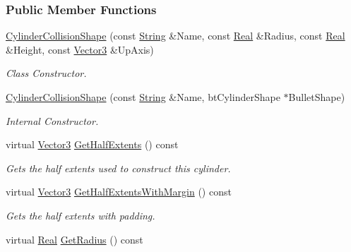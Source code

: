 \subsubsection*{Public Member Functions}
\begin{DoxyCompactItemize}
\item 
\hyperlink{classphys_1_1CylinderCollisionShape_af9ba4a0e9969355d8a985a042f1c7620}{CylinderCollisionShape} (const \hyperlink{namespacephys_aa03900411993de7fbfec4789bc1d392e}{String} \&Name, const \hyperlink{namespacephys_af7eb897198d265b8e868f45240230d5f}{Real} \&Radius, const \hyperlink{namespacephys_af7eb897198d265b8e868f45240230d5f}{Real} \&Height, const \hyperlink{classphys_1_1Vector3}{Vector3} \&UpAxis)
\begin{DoxyCompactList}\small\item\em Class Constructor. \item\end{DoxyCompactList}\item 
\hyperlink{classphys_1_1CylinderCollisionShape_af398bf897443717f5b7377bf5427a24e}{CylinderCollisionShape} (const \hyperlink{namespacephys_aa03900411993de7fbfec4789bc1d392e}{String} \&Name, btCylinderShape $\ast$BulletShape)
\begin{DoxyCompactList}\small\item\em Internal Constructor. \item\end{DoxyCompactList}\item 
virtual \hyperlink{classphys_1_1Vector3}{Vector3} \hyperlink{classphys_1_1CylinderCollisionShape_ae6cdcfc5b490a91c137f421171e339f4}{GetHalfExtents} () const 
\begin{DoxyCompactList}\small\item\em Gets the half extents used to construct this cylinder. \item\end{DoxyCompactList}\item 
virtual \hyperlink{classphys_1_1Vector3}{Vector3} \hyperlink{classphys_1_1CylinderCollisionShape_adc42df0293302ff55f35a6018aacfbae}{GetHalfExtentsWithMargin} () const 
\begin{DoxyCompactList}\small\item\em Gets the half extents with padding. \item\end{DoxyCompactList}\item 
virtual \hyperlink{namespacephys_af7eb897198d265b8e868f45240230d5f}{Real} \hyperlink{classphys_1_1CylinderCollisionShape_ac33ddce4c5e1d728675790ac522c42c0}{GetRadius} () const 

\end{DoxyCompactItemize}
